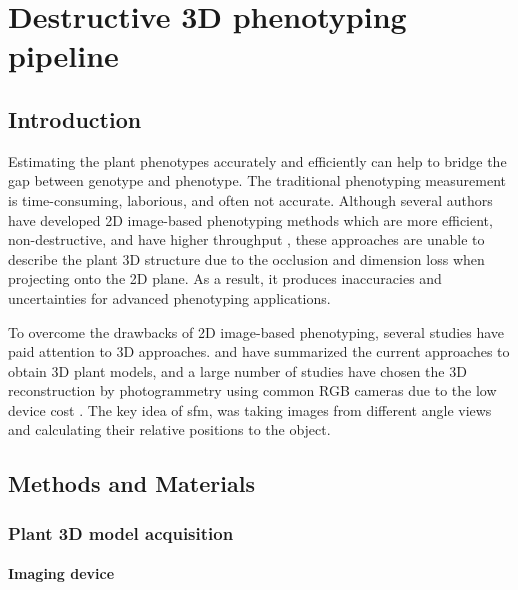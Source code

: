 \chapter{Destructive 3D phenotyping pipeline}

\section{Introduction}

Estimating the plant phenotypes accurately and efficiently can help to bridge the gap between genotype and phenotype. The traditional phenotyping measurement is time-consuming, laborious, and often not accurate. Although several authors have developed 2D image-based phenotyping methods which are more efficient, non-destructive, and have higher throughput \citep{yang_greenness_2015,guo_easypcc_2017,zou_broccoli_2019}, these approaches are unable to describe the plant 3D structure due to the occlusion and dimension loss when projecting onto the 2D plane. As a result, it produces inaccuracies and uncertainties for advanced phenotyping applications.

To overcome the drawbacks of 2D image-based phenotyping, several studies have paid attention to 3D approaches. \citet{paulus_measuring_2019} and \citet{kochi_introduction_2021} have summarized the current approaches to obtain 3D plant models, and a large number of studies have chosen the 3D reconstruction by photogrammetry using common RGB cameras due to the low device cost \citep{xiao_estimating_2021,zermas_3d_2020,zhang_estimating_2016}. The key idea of sfm, was taking images from different angle views and calculating their relative positions to the object.






\section{Methods and Materials}

\subsection{Plant 3D model acquisition}


\subsubsection{Imaging device}

